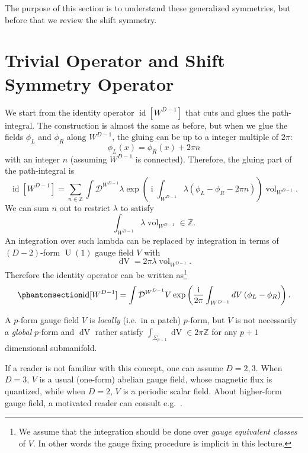 \documentclass[
  letterpaper,
  DIV=11,
  numbers=noendperiod]{scrreport}
\DeclareMathOperator{\vol}{vol}
\DeclareMathOperator{\U}{U}
\DeclareMathOperator{\imunit}{i}
\DeclareMathOperator{\id}{id}
\newcommand{\stdim}{D}
\begin{document}
The purpose of this section is to understand these generalized
symmetries, but before that we review the shift symmetry.

\section{Trivial Operator and Shift Symmetry
Operator}\label{trivial-operator-and-shift-symmetry-operator}

We start from the identity operator \(\id[W^{\stdim-1}]\) that cuts and
glues the path-integral. The construction is almost the same as before,
but when we glue the fields \(\phi_L\) and \(\phi_R\) along
\(W^{\stdim-1}\), the gluing can be up to a integer multiple of
\(2\pi\): \[
    \phi_L(x) = \phi_R(x) + 2\pi n 
\] with an integer \(n\) (assuming \(W^{\stdim-1}\) is connected).
Therefore, the gluing part of the path-integral is \[
\id[W^{\stdim-1}] = \sum_{n\in\mathbb{Z}}\int \mathcal{D}^{W^{\stdim-1}}\lambda \exp\left(\imunit\int_{W^{\stdim-1}} \lambda\left(\phi_L-\phi_R - 2\pi n\right)\right)\vol_{W^{\stdim-1}}.
\] We can sum \(n\) out to restrict \(\lambda\) to satisfy \[
    \int_{W^{\stdim-1}}\lambda \vol_{W^{\stdim-1}} \in \mathbb{Z}.
\] An integration over such lambda can be replaced by integration in
terms of \((\stdim-2)\)-form \(\U(1)\) gauge field \(V\) with \[
\mathop{dV} = 2\pi \lambda\vol_{W^{\stdim-1}}.
\] Therefore the identity operator can be written as\footnote{We assume
  that the integration should be done over \emph{gauge equivalent
  classes} of \(V\). In other words the gauge fixing procedure is
  implicit in this lecture.}
\begin{equation}\phantomsection\label{eq-identity-compact-boson}{
    \id[{W^{\stdim-1}}] = \int \mathcal{D}^{W^{\stdim-1}}V \exp\left(\frac{\imunit}{2\pi}\int_{W^{\stdim-1}} \mathop{dV}\left(\phi_L-\phi_R\right)\right).
}\end{equation}

\begin{tcolorbox}[enhanced jigsaw, opacityback=0, opacitybacktitle=0.6, leftrule=.75mm, arc=.35mm, coltitle=black, breakable, colframe=quarto-callout-note-color-frame, titlerule=0mm, colback=white, bottomrule=.15mm, left=2mm, colbacktitle=quarto-callout-note-color!10!white, toptitle=1mm, bottomtitle=1mm, title=\textcolor{quarto-callout-note-color}{\faInfo}\hspace{0.5em}{\(p\)-form gauge field}, rightrule=.15mm, toprule=.15mm]

A \(p\)-form gauge field \(V\) is \emph{locally} (i.e.~in a patch)
\(p\)-form, but \(V\) is not necessarily a \emph{global} \(p\)-form and
\(\mathop{dV}\) rather satisfy
\(\int_{\Sigma_{p+1}}\mathop{dV}\in 2\pi \mathbb{Z}\) for any \(p+1\)
dimensional submanifold.

If a reader is not familiar with this concept, one can assume
\(\stdim = 2,3\). When \(\stdim=3\), \(V\) is a usual (one-form) abelian
gauge field, whose magnetic flux is quantized, while when \(\stdim =2\),
\(V\) is a periodic scalar field. About higher-form gauge field, a
motivated reader can consult e.g.~\textcite{Hsieh:2020jpj}.

\end{tcolorbox}
\end{document}
